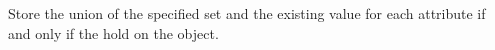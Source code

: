 Store the union of the specified set and the existing value for each attribute
if and only if the  hold on the object.




